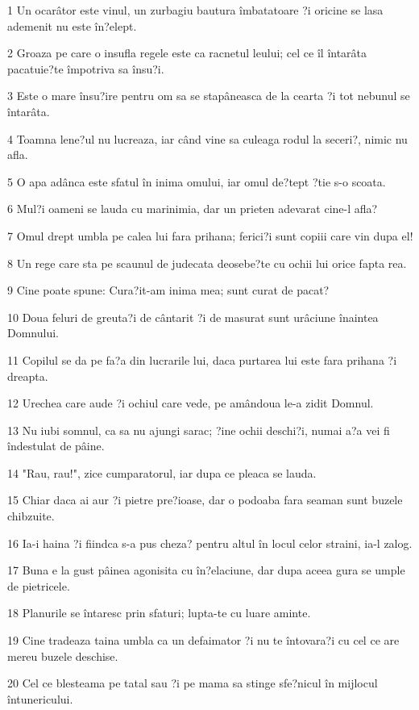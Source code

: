 \par 1 Un ocarâtor este vinul, un zurbagiu bautura îmbatatoare ?i oricine se lasa ademenit nu este în?elept.
\par 2 Groaza pe care o insufla regele este ca racnetul leului; cel ce îl întarâta pacatuie?te împotriva sa însu?i.
\par 3 Este o mare însu?ire pentru om sa se stapâneasca de la cearta ?i tot nebunul se întarâta.
\par 4 Toamna lene?ul nu lucreaza, iar când vine sa culeaga rodul la seceri?, nimic nu afla.
\par 5 O apa adânca este sfatul în inima omului, iar omul de?tept ?tie s-o scoata.
\par 6 Mul?i oameni se lauda cu marinimia, dar un prieten adevarat cine-l afla?
\par 7 Omul drept umbla pe calea lui fara prihana; ferici?i sunt copiii care vin dupa el!
\par 8 Un rege care sta pe scaunul de judecata deosebe?te cu ochii lui orice fapta rea.
\par 9 Cine poate spune: Cura?it-am inima mea; sunt curat de pacat?
\par 10 Doua feluri de greuta?i de cântarit ?i de masurat sunt urâciune înaintea Domnului.
\par 11 Copilul se da pe fa?a din lucrarile lui, daca purtarea lui este fara prihana ?i dreapta.
\par 12 Urechea care aude ?i ochiul care vede, pe amândoua le-a zidit Domnul.
\par 13 Nu iubi somnul, ca sa nu ajungi sarac; ?ine ochii deschi?i, numai a?a vei fi îndestulat de pâine.
\par 14 "Rau, rau!", zice cumparatorul, iar dupa ce pleaca se lauda.
\par 15 Chiar daca ai aur ?i pietre pre?ioase, dar o podoaba fara seaman sunt buzele chibzuite.
\par 16 Ia-i haina ?i fiindca s-a pus cheza? pentru altul în locul celor straini, ia-l zalog.
\par 17 Buna e la gust pâinea agonisita cu în?elaciune, dar dupa aceea gura se umple de pietricele.
\par 18 Planurile se întaresc prin sfaturi; lupta-te cu luare aminte.
\par 19 Cine tradeaza taina umbla ca un defaimator ?i nu te întovara?i cu cel ce are mereu buzele deschise.
\par 20 Cel ce blesteama pe tatal sau ?i pe mama sa stinge sfe?nicul în mijlocul întunericului.

